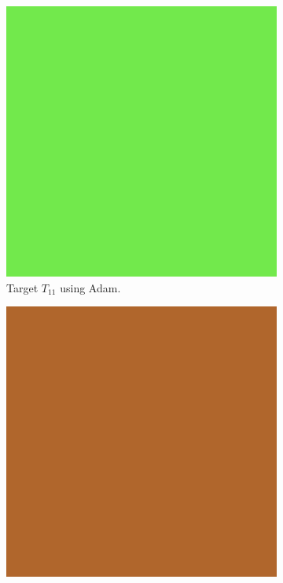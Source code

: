 \begin{figure}
\centering
\begin{subfigure}[t]{.25\textwidth}
    \centering
    \includegraphics[width=\linewidth]{img/evaluation/M1/2 param/Neural_Adam_final_render.png}
    \caption{Target $T_{11}$ using Adam.}
    \label{fig:M1NeuralFinalRenders2paramAdam}
\end{subfigure}\hspace{0.7cm}
\begin{subfigure}[t]{.25\textwidth}
    \centering
    \includegraphics[width=\linewidth]{img/evaluation/M1/random/Neural_Adam_random_final.png}

\end{subfigure}
\end{figure}
